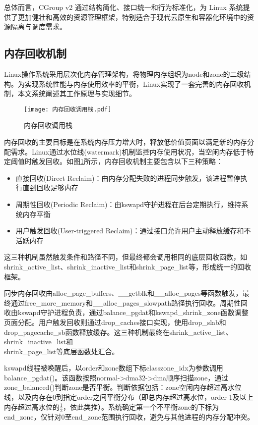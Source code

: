 总体而言，CGroup v2 通过结构简化、接口统一和行为标准化，为 Linux 系统提供了更加健壮和高效的资源管理框架，特别适合于现代云原生和容器化环境中的资源隔离与调度需求。

\subsection{内存回收机制}
\label{sec:Linux内存回收机制}

Linux操作系统采用层次化内存管理架构，将物理内存组织为node和zone的二级结构。为实现系统性能与内存使用效率的平衡，Linux实现了一套完善的内存回收机制，本文系统阐述其工作原理与实现细节。

\begin{figure}[htb]
    \centering
    \texttt{[image: 内存回收调用栈.pdf]}
    \caption{内存回收调用栈}
    \label{fig:memory_reclaim_callgraph}
\end{figure}

内存回收的主要目标是在系统内存压力增大时，释放低价值页面以满足新的内存分配需求。Linux通过水位线(watermark)机制监控内存使用状况，当空闲内存低于特定阈值时触发回收。如图\ref{fig:memory_reclaim_callgraph}所示，内存回收机制主要包含以下三种策略：

\begin{itemize}
    \item 直接回收(Direct Reclaim)：由内存分配失败的进程同步触发，该进程暂停执行直到回收足够内存
    \item 周期性回收(Periodic Reclaim)：由kswapd守护进程在后台定期执行，维持系统内存平衡
    \item 用户触发回收(User-triggered Reclaim)：通过接口允许用户主动释放缓存和不活跃内存
\end{itemize}

这三种机制虽然触发条件和路径不同，但最终都会调用相同的底层回收函数，如shrink\_active\_list、shrink\_inactive\_list和shrink\_page\_list等，形成统一的回收框架。

同步内存回收由alloc\_page\_buffers、\_\_getblk和\_\_alloc\_pages等函数触发，最终通过free\_more\_memory和\_\_alloc\_pages\_slowpath路径执行回收。周期性回收由kswapd守护进程负责，通过balance\_pgdat和kswapd\_shrink\_zone函数调整页面分配。用户触发回收则通过drop\_caches接口实现，使用drop\_slab和drop\_pagecache\_sb函数释放缓存。这三种机制最终在shrink\_active\_list、shrink\_inactive\_list和\\shrink\_page\_list等底层函数处汇合。

kswapd线程被唤醒后，以order和zone数组下标classzone\_idx为参数调用balance\_pgdat()。该函数按照normal->dma32->dma顺序扫描zone，通过zone\_balanced()判断zone是否平衡。判断依据包括：zone空闲内存超过高水位线，以及内存在0到指定order之间平衡分布（即总内存超过高水位，order-1及以上内存超过高水位的\(\frac{1}{2}\)，依此类推）。系统确定第一个不平衡zone的下标为end\_zone，仅针对0至end\_zone范围执行回收，避免与其他进程的内存分配冲突。

